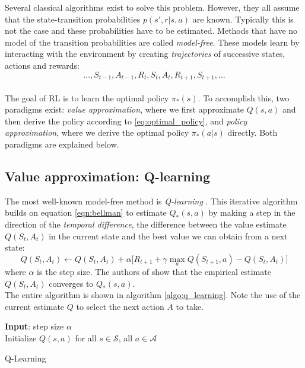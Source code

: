 Several classical algorithms exist to solve this problem. However, they all assume that the state-transition probabilities $p(s', r | s, a)$ are known. Typically this is not the case and these probabilities have to be estimated. Methods that have no model of the transition probabilities are called \emph{model-free}. These models learn by interacting with the environment by creating \emph{trajectories} of successive states, actions and rewards:
$$
\ldots, S_{t-1}, A_{t-1}, R_t, S_t, A_t, R_{t+1}, S_{t+1}, \ldots
$$
\\
The goal of RL is to learn the optimal policy $\pi_{*}(s)$. To accomplish this, two paradigms exist: \emph{value approximation}, where we first approximate $Q(s,a)$ and then derive the policy according to \ref{eq:optimal_policy}, and \emph{policy approximation}, where we derive the optimal policy $\pi_{*}(a|s)$ directly. Both paradigms are explained below.
\subsection{Value approximation: Q-learning}
\label{sec:intro_q_learning}
The most well-known model-free method is \emph{Q-learning} \cite{watkins1989learning}. This iterative algorithm builds on equation \ref{eqn:bellman} to estimate $Q_{*}(s,a)$ by making a step in the direction of the \emph{temporal difference}, the difference between the value estimate $Q(S_t, A_t)$ in the current state and the best value we can obtain from a next state:
\begin{equation}
    Q(S_t, A_t) \leftarrow Q(S_t, A_t) + \alpha \big[R_{t+1} + \gamma \max_{a} Q(S_{t+1}, a) - Q(S_t, A_t) \big]
    \label{eqn:q_learning}
\end{equation}
where $\alpha$ is the step size. The authors of \cite{watkins1992q} show that the empirical estimate $Q(S_t, A_t)$ converges to $Q_{*}(s,a)$.\\

The entire algorithm is shown in algorithm \ref{algo:q_learning}. Note the use of the current estimate $Q$ to select the next action $A$ to take.

\begin{algorithm}[H]
\SetAlgoLined
\textbf{Input}:  step size $\alpha$\\
Initialize $Q(s,a)$ for all $s \in \mathcal{S}$, all $a \in \mathcal{A}$\\
 \caption{Q-Learning}
 \label{algo:q_learning}
\end{algorithm}

